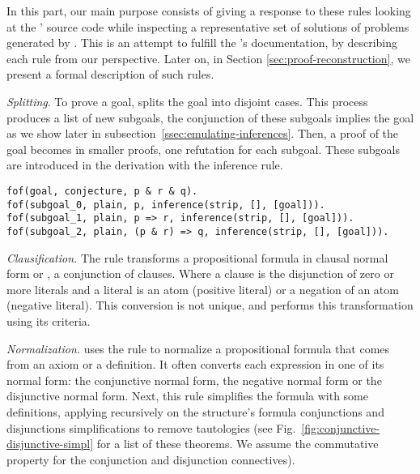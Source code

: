 \documentclass[../main.tex]{subfiles}
\begin{document}

In this part, our main purpose consists of giving a response to
these rules looking at the \Metis' source code while inspecting a
representative set of solutions of \CPL problems
\cite{Prieto-Cubides2017} generated by \Metis.
This is an attempt to fulfill the \Metis's documentation, by
describing each rule from our perspective. Later on, in Section
\ref{sec:proof-reconstruction}, we present a formal description of
such rules.

\vskip 2mm


\textit{Splitting}. To prove a goal, \Metis splits the goal into
disjoint cases. This process produces a list of new subgoals, the
conjunction of these subgoals implies the goal as we show later in
subsection~\ref{ssec:emulating-inferences}. Then, a proof of the
goal becomes in smaller proofs, one refutation for each subgoal.
These subgoals are introduced in the \TSTP derivation with the \strip
inference rule.

\begin{verbatim}
fof(goal, conjecture, p & r & q).
fof(subgoal_0, plain, p, inference(strip, [], [goal])).
fof(subgoal_1, plain, p => r, inference(strip, [], [goal])).
fof(subgoal_2, plain, (p & r) => q, inference(strip, [], [goal])).
\end{verbatim}


\textit{Clausification.} The \clausify rule transforms a
propositional formula in clausal normal form or \CNF, a conjunction
of clauses. Where a clause is the disjunction of zero or more
literals and a literal is an atom (positive literal) or a negation
of an atom (negative literal). This conversion is not unique, and
\Metis performs this transformation using its criteria.


\textit{Normalization.} \Metis uses the \canonicalize rule to
normalize a propositional formula that comes from an axiom or a
definition. It often converts each expression in one of its normal
form: the conjunctive normal form, the negative normal form or the
disjunctive normal form. Next, this rule simplifies the formula
with some definitions, applying recursively on the structure's
formula conjunctions and disjunctions simplifications to remove
tautologies (see Fig.~\ref{fig:conjunctive-disjunctive-simpl} for a
list of these theorems. We assume the commutative property for the
conjunction and disjunction connectives).
\end{document}
